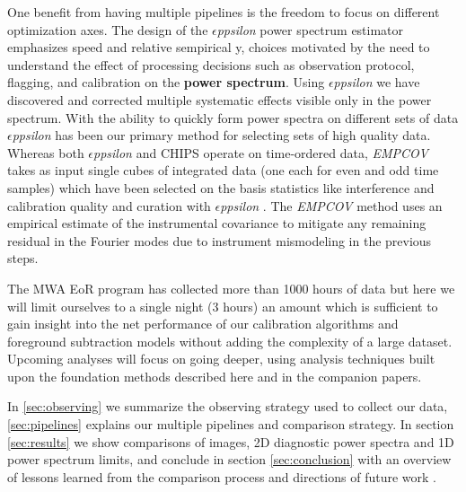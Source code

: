 \documentclass[preprint]{aastex}
\def\eppsilon{{\it $\epsilon$ppsilon }}
\def\empirical cov{\emph{EMPCOV }}
\begin{document}
One benefit from having multiple pipelines is the freedom to focus on different optimization axes.  The design of the \eppsilon power spectrum estimator emphasizes speed and relative sempirical y, choices  motivated by the need to understand the effect of processing decisions such as observation protocol, flagging, and calibration on the {\bf power spectrum}. Using \eppsilon we have discovered and corrected multiple systematic effects visible only in the power spectrum. With the ability to quickly form power spectra on different sets of data \eppsilon has been our primary method for selecting sets of high quality data. Whereas both \eppsilon and CHIPS operate on time-ordered data, \empirical cov takes as input single cubes of integrated data (one each for even and odd time samples) which have been selected on the basis statistics like interference and calibration quality and curation with \eppsilon. The \empirical cov method uses an empirical estimate of the instrumental covariance to mitigate any remaining residual in the Fourier modes due to instrument mismodeling in the previous steps. 

 The MWA EoR program has collected more than 1000 hours of data but here we will limit ourselves to a single night (3 hours) an amount which is sufficient to gain insight into the net performance of our calibration algorithms and foreground subtraction models without adding the complexity of a large dataset.  Upcoming analyses will focus on going deeper, using analysis techniques built upon the foundation methods described here and in the companion papers.

In \ref{sec:observing} we summarize the observing strategy used to collect our data, \ref{sec:pipelines} explains our multiple pipelines and comparison strategy. In section \ref{sec:results} we show comparisons of images, 2D diagnostic power spectra and 1D power spectrum limits, and conclude in section \ref{sec:conclusion} with an overview of lessons learned from the comparison process and directions of future work .
\end{document}
